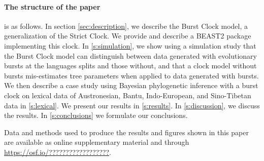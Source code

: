 \documentclass[a4paper,12pt]{scrartcl}
\begin{document}
\paragraph{The structure of the paper} is as follows. In section
\cref{sec:description}, we describe the Burst Clock model, a generalization of
the Strict Clock. We provide and describe a BEAST2 \parencite{beast2} package
implementing this clock. In \cref{s:simulation}, we show using a simulation
study that the Burst Clock model can distinguish between data generated with
evolutionary bursts at the languages splits and those without, and that
a clock model without bursts mis-estimates tree parameters when applied to data
generated with bursts.
We then describe a case study using Bayesian phylogenetic inference
with a burst clock on
lexical data of Austronesian, Bantu, Indo-European, and Sino-Tibetan data in
\cref{s:lexical}.
We present our results in
\cref{s:results}. In \cref{s:discussion}, we discuss the results. In
\cref{s:conclusions} we formulate our conclusions.

Data and methods used to produce the results and figures shown in this paper are
available as online supplementary material and through
\url{https://osf.io/??????????????????}.
\end{document}

